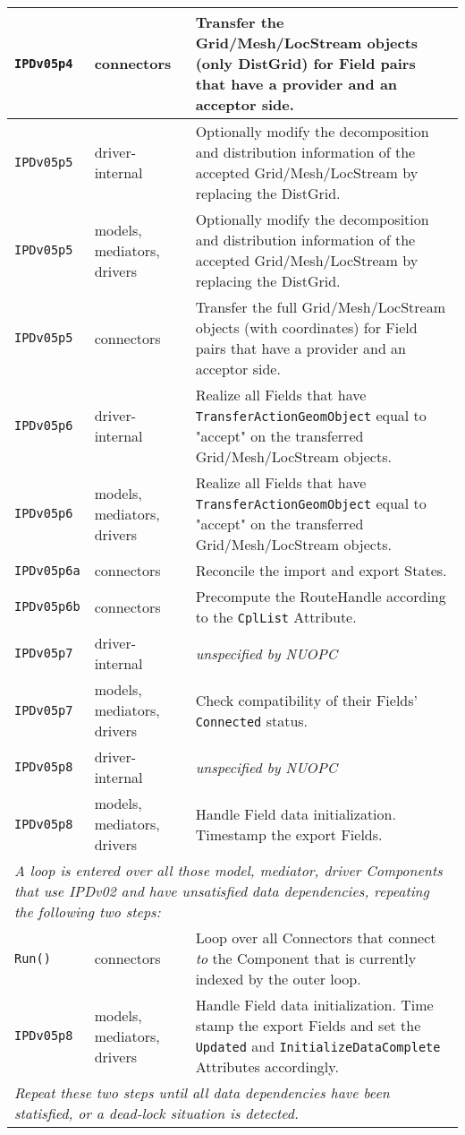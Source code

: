 \begin{longtable}[h]{|p{}|p{}|p{}|}
     {\tt IPDv05p4}   & connectors                  & Transfer the Grid/Mesh/LocStream objects (only DistGrid) for Field pairs that have a provider and an acceptor side.\\ \hline
     {\tt IPDv05p5}   & driver-internal             & Optionally modify the decomposition and distribution information of the accepted Grid/Mesh/LocStream by replacing the DistGrid.\\ \hline
     {\tt IPDv05p5}   & models, mediators, drivers  & Optionally modify the decomposition and distribution information of the accepted Grid/Mesh/LocStream by replacing the DistGrid.\\ \hline
     {\tt IPDv05p5}   & connectors                  & Transfer the full Grid/Mesh/LocStream objects (with coordinates) for Field pairs that have a provider and an acceptor side.\\ \hline
     {\tt IPDv05p6}   & driver-internal             & Realize all Fields that have {\tt TransferActionGeomObject} equal to "accept" on the transferred Grid/Mesh/LocStream objects.\\ \hline
     {\tt IPDv05p6}   & models, mediators, drivers  & Realize all Fields that have {\tt TransferActionGeomObject} equal to "accept" on the transferred Grid/Mesh/LocStream objects.\\ \hline
     {\tt IPDv05p6a}  & connectors                  & Reconcile the import and export States.\\ \hline
     {\tt IPDv05p6b}  & connectors                  & Precompute the RouteHandle according to the {\tt CplList} Attribute.\\ \hline
     {\tt IPDv05p7}   & driver-internal             & {\em unspecified by NUOPC}\\ \hline
     {\tt IPDv05p7}   & models, mediators, drivers  & Check compatibility of their Fields' {\tt Connected} status.\\ \hline
     {\tt IPDv05p8}   & driver-internal             & {\em unspecified by NUOPC}\\ \hline
     {\tt IPDv05p8}   & models, mediators, drivers  & Handle Field data initialization. Timestamp the export Fields.\\ \hline
     \multicolumn{3}{|p{13.5cm}|}{\it A loop is entered over all those model, mediator, driver Components that use IPDv02 and have
     unsatisfied data dependencies, repeating the following two steps:}\\ \hline
     {\tt Run()}      & connectors                  & Loop over all Connectors that connect {\it to} the Component that is currently indexed by the outer loop.\\ \hline
     {\tt IPDv05p8}   & models, mediators, drivers  & Handle Field data initialization. Time stamp the export Fields and set the {\tt Updated} and {\tt InitializeDataComplete} Attributes accordingly.\\ \hline
     \multicolumn{3}{|p{13.5cm}|}{\it Repeat these two steps until all data
     dependencies have been statisfied, or a dead-lock situation is detected.}\\ 
     \hline\hline
\end{longtable}


